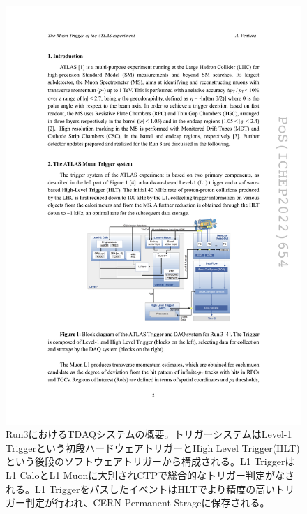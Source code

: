 \begin{figure} 
\centering
\includegraphics[width=16cm]{fig/Intro/Run3_TDAQ.pdf}
\caption[Run3におけるTDAQシステムの概要]{Run3におけるTDAQシステムの概要\cite{Run3_TDAQ}。トリガーシステムはLevel-1 Triggerという初段ハードウェアトリガーとHigh Level Trigger(HLT)という後段のソフトウェアトリガーから構成される。L1 TriggerはL1 CaloとL1 Muonに大別されCTPで総合的なトリガー判定がなされる。L1 TriggerをパスしたイベントはHLTでより精度の高いトリガー判定が行われ、CERN Permanent Strageに保存される。 }
\label{Run3_TDAQ}
\end{figure}

